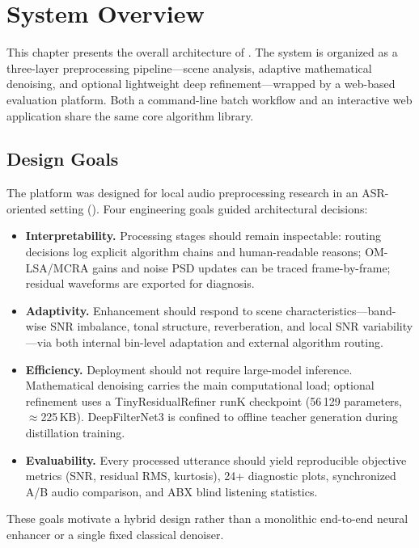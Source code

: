 \chapter{System Overview}
\label{ch:system}

This chapter presents the overall architecture of \projectshort{}. The system is organized as a three-layer preprocessing pipeline---scene analysis, adaptive mathematical denoising, and optional lightweight deep refinement---wrapped by a web-based evaluation platform. Both a command-line batch workflow and an interactive web application share the same core algorithm library.

\section{Design Goals}
\label{sec:design_goals}

The platform was designed for local audio preprocessing research in an ASR-oriented setting (). Four engineering goals guided architectural decisions:

\begin{itemize}
  \item \textbf{Interpretability.} Processing stages should remain inspectable: routing decisions log explicit algorithm chains and human-readable reasons; OM-LSA/MCRA gains and noise PSD updates can be traced frame-by-frame; residual waveforms are exported for diagnosis.
  \item \textbf{Adaptivity.} Enhancement should respond to scene characteristics---band-wise SNR imbalance, tonal structure, reverberation, and local SNR variability---via both internal bin-level adaptation and external algorithm routing.
  \item \textbf{Efficiency.} Deployment should not require large-model inference. Mathematical denoising carries the main computational load; optional refinement uses a TinyResidualRefiner runK checkpoint (56\,129 parameters, $\approx$225\,KB). DeepFilterNet3 is confined to offline teacher generation during distillation training.
  \item \textbf{Evaluability.} Every processed utterance should yield reproducible objective metrics (SNR, residual RMS, kurtosis), 24+ diagnostic plots, synchronized A/B audio comparison, and ABX blind listening statistics.
\end{itemize}

These goals motivate a hybrid design rather than a monolithic end-to-end neural enhancer or a single fixed classical denoiser.

